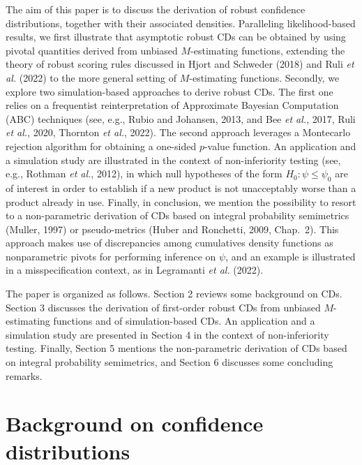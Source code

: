 \documentclass[preprint,12pt,authoryear]{elsarticle}
\begin{document}
The aim of this paper is to discuss the derivation of robust confidence distributions, together with their associated densities. Paralleling likelihood-based results, we first  illustrate that asymptotic robust CDs can be obtained by using pivotal quantities derived from unbiased $M$-estimating functions, extending the theory of robust scoring rules discussed in Hjort and Schweder (2018)   and Ruli {\em et al.} (2022) to the more general setting of $M$-estimating functions. Secondly, we  explore two simulation-based approaches to derive robust CDs. The first one relies  on a frequentist reinterpretation of Approximate Bayesian Computation (ABC) techniques (see, e.g.,  Rubio and Johansen, 2013, and Bee {\em et al.}, 2017, Ruli {\em et al.}, 2020, Thornton {\em et al.}, 2022). The second approach leverages a Montecarlo rejection algorithm for obtaining a one-sided $p$-value function. An application and a simulation study are illustrated in the context of non-inferiority testing (see, e.g., Rothman {\em et al.}, 2012), in which null hypotheses of the form $H_0: \psi \leq \psi_0$ are of interest in order to establish if a new product is not unacceptably worse than a product already in use. Finally, in conclusion, we mention the possibility to resort to a non-parametric derivation of CDs based on integral probability semimetrics (Muller, 1997) or pseudo-metrics (Huber and Ronchetti, 2009, Chap.\ 2). This approach makes use of discrepancies among cumulatives density functions as nonparametric pivots for performing inference on $\psi$, and an example is illustrated in a misspecification context, as in Legramanti {\em et al.} (2022).

The paper is organized as follows. Section 2  reviews  some background on CDs. Section 3 discusses the derivation of first-order robust CDs from unbiased $M$-estimating functions and of simulation-based CDs. An application and a simulation study are presented in Section 4 in the context of non-inferiority testing. Finally, Section 5 mentions the non-parametric derivation of CDs based on integral probability semimetrics, and Section 6 discusses some concluding remarks.


\section{%
Background on confidence distributions}

\end{document}
